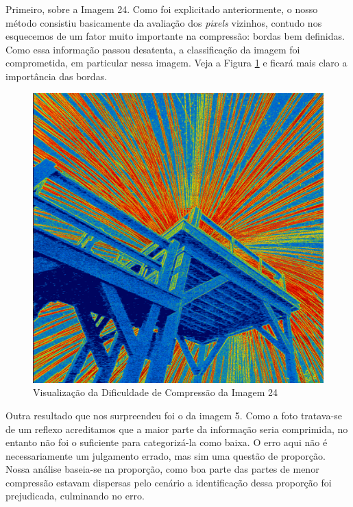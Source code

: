 \paragrafo Primeiro, sobre a Imagem 24. Como foi explicitado anteriormente, o nosso método consistiu basicamente da avaliação dos \textit{pixels} vizinhos, contudo nos esquecemos de um fator muito importante na compressão: bordas bem definidas. Como essa informação passou desatenta, a classificação da imagem foi comprometida, em particular nessa imagem. Veja a Figura \ref{fig:ceu_fogo_de_artificio} e ficará mais claro a importância das bordas.

\begin{figure}[h!]
    \centering
    \caption{Visualização da Dificuldade de Compressão da Imagem 24}
    \label{fig:ceu_fogo_de_artificio}
    
    \includegraphics[scale=0.1]{Documeto/1-ElementosTextuais/1-Desenvolvimento/imagens-atividade3/IMG24T.png}

    
\end{figure}

\paragrafo Outra resultado que nos surpreendeu foi o da imagem 5. Como a foto tratava-se de um reflexo acreditamos que a maior parte da informação seria comprimida, no entanto não foi o suficiente para categorizá-la como baixa. O erro aqui não é necessariamente um julgamento errado, mas sim uma questão de proporção. Nossa análise baseia-se na proporção, como boa parte das partes de menor compressão estavam dispersas pelo cenário a identificação dessa proporção foi prejudicada, culminando no erro.

